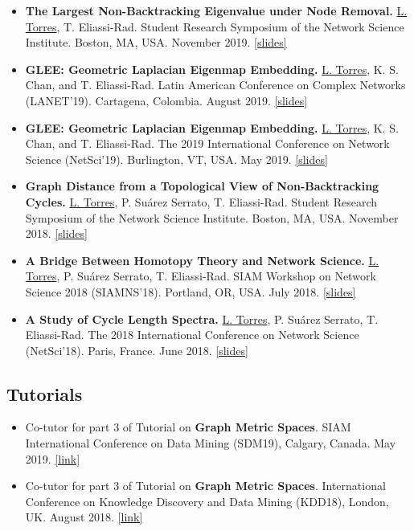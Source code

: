 \documentclass[12pt,]{scrartcl}
\newenvironment{myitemize}
{ \begin{itemize}
    \setlength{\itemsep}{5pt}
    \setlength{\parskip}{0pt}
    \setlength{\parsep}{0pt}     }
{ \end{itemize}                  }
\begin{document}
\begin{myitemize}
\leftskip-0.25in %

\item \textbf{The Largest Non-Backtracking Eigenvalue under Node Removal.} \underline{L. Torres}, T. Eliassi-Rad. Student Research Symposium of the Network Science Institute. Boston, MA, USA. November 2019. \href{http://leotrs.com/static/symposium2019.pdf}{[slides]}

\item \textbf{GLEE: Geometric Laplacian Eigenmap Embedding.} \underline{L. Torres}, K. S. Chan, and T. Eliassi-Rad. Latin American Conference on Complex Networks (LANET'19). Cartagena, Colombia. August 2019. \href{http://leotrs.com/static/GLEE_lanet19.pdf}{[slides]}

\item \textbf{GLEE: Geometric Laplacian Eigenmap Embedding.} \underline{L. Torres}, K. S. Chan, and T. Eliassi-Rad. The 2019 International Conference on Network Science (NetSci'19). Burlington, VT, USA. May 2019. \href{http://leotrs.com/static/GLEE_netsci19.pdf}{[slides]}

\item \textbf{Graph Distance from a Topological View of Non-Backtracking Cycles.} \underline{L. Torres}, P. Suárez Serrato, T. Eliassi-Rad. Student Research Symposium of the Network Science Institute. Boston, MA, USA. November 2018. \href{http://leotrs.com/static/netsci18.pdf}{[slides]}

\item \textbf{A Bridge Between Homotopy Theory and Network Science.} \underline{L. Torres}, P. Suárez Serrato, T. Eliassi-Rad. SIAM Workshop on Network Science 2018 (SIAMNS'18). Portland, OR, USA. July 2018. \href{http://leotrs.com/static/siamns18.pdf}{[slides]}

\item \textbf{A Study of Cycle Length Spectra.} \underline{L. Torres}, P. Suárez Serrato, T. Eliassi-Rad. The 2018 International Conference on Network Science (NetSci'18). Paris, France. June 2018. \href{http://leotrs.com/static/netsci18.pdf}{[slides]}

\end{myitemize}

\subsection{Tutorials}\label{tutorials}

\begin{myitemize}
\leftskip-0.25in

\item Co-tutor for part 3 of Tutorial on \textbf{Graph Metric Spaces}. SIAM International Conference on Data Mining (SDM19), Calgary, Canada. May 2019.
\href{https://neu-spiral.github.io/GraphMetricSpaces/}{[link]}

\item Co-tutor for part 3 of Tutorial on \textbf{Graph Metric Spaces}. International Conference on Knowledge Discovery and Data Mining (KDD18), London, UK. August 2018. \href{https://neu-spiral.github.io/GraphMetricSpaces/}{[link]}

\end{myitemize}
\end{document}
